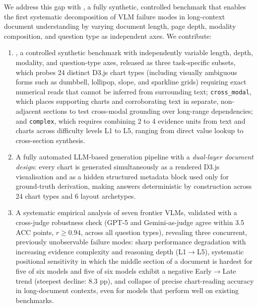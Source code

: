 We address this gap with \textbf{\synthdocbench{}}, a fully synthetic, controlled benchmark that enables the first systematic decomposition of VLM failure modes in long-context document understanding by varying document length, page depth, modality composition, and question type as independent axes. We contribute:

\begin{enumerate} [nolistsep, noitemsep, leftmargin=12pt]
    \item \synthdocbench{}, a controlled synthetic benchmark with independently variable length, depth, modality, and question-type axes, released as three task-specific subsets, which probes 24 distinct D3.js chart types (including visually ambiguous forms such as dumbbell, lollipop, slope, and sparkline grids) requiring exact numerical reads that cannot be inferred from surrounding text; \texttt{cross\_modal}, which places supporting charts and corroborating text in separate, non-adjacent sections to test cross-modal grounding over long-range dependencies; and \texttt{complex}, which requires combining 2 to 4 evidence units from text and charts across difficulty levels L1 to L5, ranging from direct value lookup to cross-section synthesis. 
    \item A fully automated LLM-based generation pipeline with a \emph{dual-layer document design}: every chart is generated simultaneously as a rendered D3.js visualisation and as a hidden structured metadata block used only for ground-truth derivation, making answers deterministic by construction across 24 chart types and 6 layout archetypes.
    \item A systematic empirical analysis of seven frontier VLMs, validated with a cross-judge robustness check (GPT-5 and Gemini-as-judge agree within 3.5 ACC points, $r \geq 0.94$, across all question types), revealing three concurrent, previously unobservable failure modes: sharp performance degradation with increasing evidence complexity and reasoning depth (L1$\to$L5), systematic positional sensitivity in which the middle section of a document is hardest for five of six models and five of six models exhibit a negative Early$\to$Late trend (steepest decline: 8.3 pp), and collapse of precise chart-reading accuracy in long-document contexts, even for models that perform well on existing benchmarks.
\end{enumerate}




